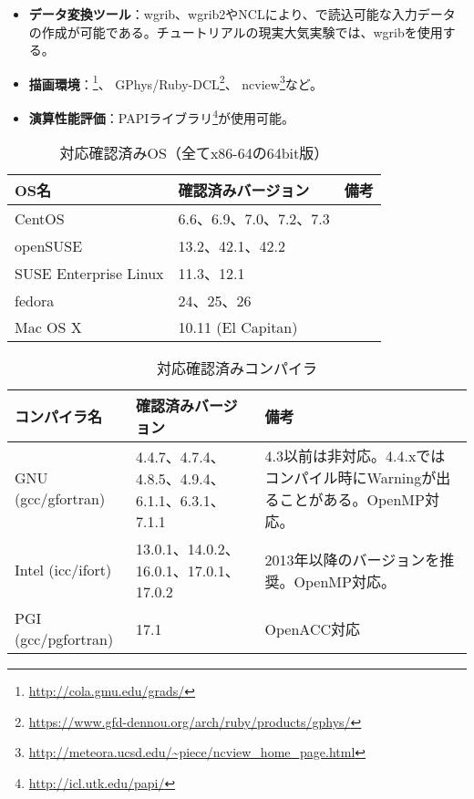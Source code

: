 \begin{itemize}
  \item {\bf データ変換ツール}：wgrib、wgrib2やNCLにより、\scalerm で読込可能な入力データの作成が可能である。チュートリアルの現実大気実験では、wgribを使用する。
  \item {\bf 描画環境}：\grads \footnote{\url{http://cola.gmu.edu/grads/}}、
GPhys/Ruby-DCL\footnote{\url{https://www.gfd-dennou.org/arch/ruby/products/gphys/}}、
ncview\footnote{\url{http://meteora.ucsd.edu/~piece/ncview\_home\_page.html}}など。
  \item {\bf 演算性能評価}：PAPIライブラリ\footnote{\url{http://icl.utk.edu/papi/}}が使用可能。
\end{itemize}


\begin{table}[htb]
\begin{center}
\caption{対応確認済みOS（全てx86-64の64bit版）}
\begin{tabularx}{150mm}{|l|l|X|} \hline
 \rowcolor[gray]{0.9} OS名 & 確認済みバージョン & 備考 \\ \hline
 CentOS                & 6.6、6.9、7.0、7.2、7.3 &  \\ \hline
 openSUSE              & 13.2、42.1、42.2        &  \\ \hline
 SUSE Enterprise Linux & 11.3、12.1         &  \\ \hline
 fedora                & 24、25、26         &  \\ \hline
 Mac OS X              & 10.11 (El Capitan) &  \\ \hline
\end{tabularx}
\label{tab:compatible_os}
\end{center}
\end{table}

\begin{table}[htb]
\begin{center}
\caption{対応確認済みコンパイラ}
\begin{tabularx}{150mm}{|l|X|X|} \hline
 \rowcolor[gray]{0.9} コンパイラ名 & 確認済みバージョン & 備考 \\ \hline
 GNU (gcc/gfortran)    & 4.4.7、4.7.4、4.8.5、4.9.4、6.1.1、6.3.1、7.1.1 & 4.3以前は非対応。4.4.xではコンパイル時にWarningが出ることがある。OpenMP対応。 \\ \hline
 Intel (icc/ifort)     & 13.0.1、14.0.2、16.0.1、17.0.1、17.0.2 & 2013年以降のバージョンを推奨。OpenMP対応。 \\ \hline
 PGI (gcc/pgfortran)   & 17.1                   & OpenACC対応 \\ \hline
\end{tabularx}
\label{tab:compatible_compiler}
\end{center}
\end{table}

